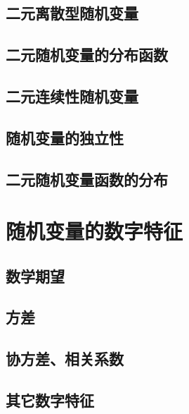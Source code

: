 \documentclass[12pt, a4paper, oneside]{ctexbook}
\begin{document}
\section{二元离散型随机变量}

\section{二元随机变量的分布函数}

\section{二元连续性随机变量}

\section{随机变量的独立性}

\section{二元随机变量函数的分布}

\chapter{随机变量的数字特征}
\section{数学期望}

\section{方差}
\section{协方差、相关系数}
\section{其它数字特征}
\end{document}
